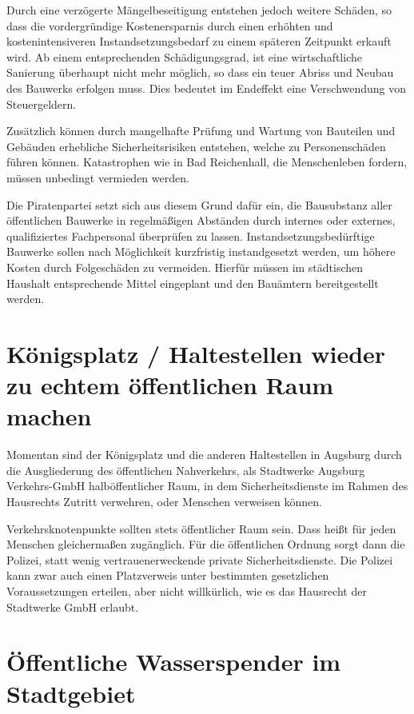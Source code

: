   Durch eine verzögerte Mängelbeseitigung entstehen jedoch weitere Schäden, so 
  dass die vordergründige Kostenersparnis durch einen erhöhten und 
  kostenintensiveren Instandsetzungsbedarf zu einem späteren Zeitpunkt erkauft 
  wird. Ab einem entsprechenden Schädigungsgrad, ist eine wirtschaftliche 
  Sanierung überhaupt nicht mehr möglich, so dass ein teuer Abriss und Neubau 
  des Bauwerks erfolgen muss. Dies bedeutet im Endeffekt eine Verschwendung 
  von Steuergeldern.
  
  Zusätzlich können durch mangelhafte Prüfung und Wartung von Bauteilen und 
  Gebäuden erhebliche Sicherheitsrisiken entstehen, welche zu Personenschäden 
  führen können. Katastrophen wie in Bad Reichenhall, die Menschenleben 
  fordern, müssen unbedingt vermieden werden.
  
  Die Piratenpartei setzt sich aus diesem Grund dafür ein, die Bausubstanz 
  aller öffentlichen Bauwerke in regelmäßigen Abständen durch internes oder 
  externes, qualifiziertes Fachpersonal überprüfen zu lassen. 
  Instandsetzungsbedürftige Bauwerke sollen nach Möglichkeit kurzfristig 
  instandgesetzt werden, um höhere Kosten durch Folgeschäden zu vermeiden. 
  Hierfür müssen im städtischen Haushalt entsprechende Mittel eingeplant und 
  den Bauämtern bereitgestellt werden.
  
  \section{Königsplatz / Haltestellen wieder zu echtem öffentlichen Raum 
  machen}
  
  Momentan sind der Königsplatz und die anderen Haltestellen in Augsburg durch 
  die Ausgliederung des öffentlichen Nahverkehrs, als Stadtwerke Augsburg 
  Verkehrs-GmbH halböffentlicher Raum, in dem Sicherheitsdienste im Rahmen des 
  Hausrechts Zutritt verwehren, oder Menschen verweisen können.
  
  Verkehrsknotenpunkte sollten stets öffentlicher Raum sein. Dass heißt für 
  jeden Menschen gleichermaßen zugänglich. Für die öffentlichen Ordnung sorgt 
  dann die Polizei, statt wenig vertrauenerweckende private
  Sicherheitsdienste. Die Polizei kann zwar auch einen Platzverweis unter 
  bestimmten gesetzlichen Voraussetzungen erteilen, aber nicht willkürlich, 
  wie es das Hausrecht der Stadtwerke GmbH erlaubt.
  
  \section{Öffentliche Wasserspender im Stadtgebiet}
  
